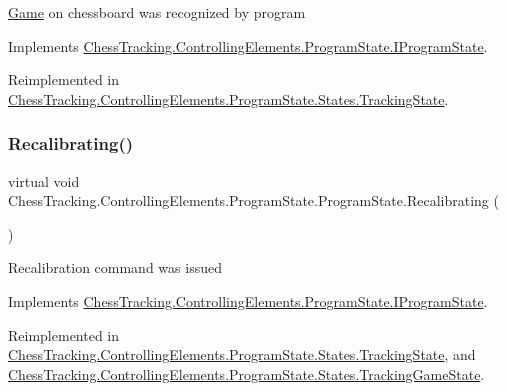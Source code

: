 \mbox{\hyperlink{namespace_chess_tracking_1_1_game}{Game}} on chessboard was recognized by program 



Implements \mbox{\hyperlink{interface_chess_tracking_1_1_controlling_elements_1_1_program_state_1_1_i_program_state_a4b28776980cafc1555ae100548aaf046}{Chess\+Tracking.\+Controlling\+Elements.\+Program\+State.\+I\+Program\+State}}.



Reimplemented in \mbox{\hyperlink{class_chess_tracking_1_1_controlling_elements_1_1_program_state_1_1_states_1_1_tracking_state_a36f3273295b31a2c88c7ed5c35778460}{Chess\+Tracking.\+Controlling\+Elements.\+Program\+State.\+States.\+Tracking\+State}}.

\mbox{\label{class_chess_tracking_1_1_controlling_elements_1_1_program_state_1_1_program_state_a702ebae08f0615d645dfaa4334ea62fc}} 
\subsubsection{\texorpdfstring{Recalibrating()}{Recalibrating()}}
{\footnotesize\ttfamily virtual void Chess\+Tracking.\+Controlling\+Elements.\+Program\+State.\+Program\+State.\+Recalibrating (\begin{DoxyParamCaption}{ }\end{DoxyParamCaption})\hspace{0.3cm}{\ttfamily [virtual]}}



Recalibration command was issued 



Implements \mbox{\hyperlink{interface_chess_tracking_1_1_controlling_elements_1_1_program_state_1_1_i_program_state_ab429b32115bb96d9a91e3966c12096a9}{Chess\+Tracking.\+Controlling\+Elements.\+Program\+State.\+I\+Program\+State}}.



Reimplemented in \mbox{\hyperlink{class_chess_tracking_1_1_controlling_elements_1_1_program_state_1_1_states_1_1_tracking_state_a3a8001d1ae948604124652f58164fa89}{Chess\+Tracking.\+Controlling\+Elements.\+Program\+State.\+States.\+Tracking\+State}}, and \mbox{\hyperlink{class_chess_tracking_1_1_controlling_elements_1_1_program_state_1_1_states_1_1_tracking_game_state_a52925b07fb679d59e78b218c7c12d78c}{Chess\+Tracking.\+Controlling\+Elements.\+Program\+State.\+States.\+Tracking\+Game\+State}}.

